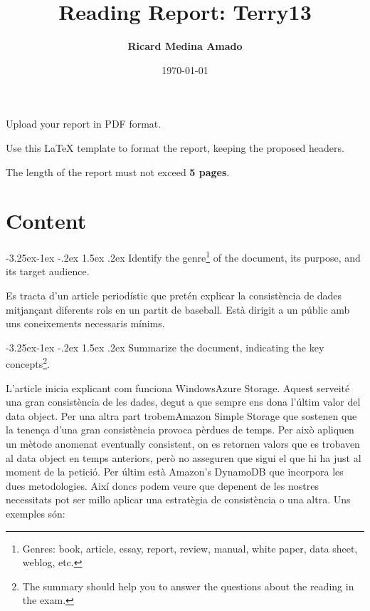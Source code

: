 \documentclass[a4paper, 10pt]{article}
\title{Reading Report: Terry13}
\author{\textbf{Ricard Medina Amado}}
\date{\normalsize\today{}}
\makeatletter
\renewcommand\subsection{\@startsection{subsection}{2}{\z@}
	{-3.25ex\@plus -1ex \@minus -.2ex}%
	{1.5ex \@plus .2ex}%
	{\normalfont\large\itshape}}
\makeatother
\begin{document}
\maketitle

\begin{center}
  Upload your report in PDF format.
  
  Use this LaTeX template to format the report, keeping the proposed headers.
  
  The length of the report must not exceed \textbf{5 pages}.
\end{center}

\section{Content}

\subsection{Identify the genre\protect\footnote{Genres: book, article, essay, report, review, manual, white paper, data sheet, weblog, etc.} of the document, its purpose, and its target audience.}

Es tracta d'un article periodístic que pretén explicar la consistència de dades mitjançant diferents rols en un partit de baseball. Està dirigit a un públic amb uns coneixements necessaris mínims.

\subsection{Summarize the document, indicating the key concepts\protect\footnote{The summary should help you to answer the questions about the reading in the exam.}.}

L'article inicia explicant com funciona WindowsAzure Storage. Aquest serveité una gran consistència de les dades, degut a que sempre ens dona l'últim valor del data object.
Per una altra part trobemAmazon Simple Storage que sostenen que la tenença d'una gran consistència
provoca pèrdues de temps. Per això apliquen un mètode anomenat eventually consistent, on es retornen valors que es trobaven al data object en temps anteriors, però no asseguren que sigui el que hi ha just al moment de la petició.
Per últim està Amazon's DynamoDB que incorpora les dues metodologies.
Així doncs podem veure que depenent de les nostres necessitats pot ser millo aplicar una estratègia de consistència o una altra. Uns exemples són:
\newline
\end{document}
